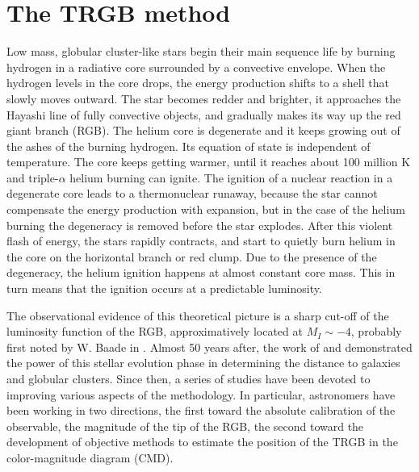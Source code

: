 \documentclass[11pt,preprint2]{aastex}
\begin{document}
\section{The TRGB method}
Low mass, globular cluster-like stars begin their main sequence life by burning hydrogen in a radiative core surrounded by a convective envelope. When the hydrogen levels in the core drops, the energy production shifts to a shell that slowly moves outward. The star becomes redder and brighter, it approaches the Hayashi  line of fully convective objects, and gradually makes its way up the red giant branch (RGB). The helium core is degenerate and it keeps growing out of the ashes of the burning hydrogen. Its equation of state is independent of temperature. The core keeps getting warmer, until it reaches about 100 million K and triple-$\alpha$ helium burning can ignite. The ignition of a nuclear reaction in a degenerate core leads to a thermonuclear runaway, because the star cannot compensate the energy production with expansion, but in the case of the helium burning the degeneracy is removed before the star explodes. After this violent flash of energy, the stars rapidly contracts, and start to quietly burn helium in the core on the horizontal branch or red clump. Due to the presence of the degeneracy, the helium ignition happens at almost constant core mass. This in turn means that the ignition occurs at a predictable luminosity.

The observational evidence of this theoretical picture is a sharp cut-off of the luminosity function of the RGB, approximatively located at $M_I \sim -4$, probably first noted by W. Baade in \citeyear{1944ApJ...100..137B}. Almost 50 years after, the work of \cite{1990AJ....100..162D} and \cite{1993ApJ...417..553L} demonstrated the power of this stellar evolution phase in determining the distance to galaxies and globular clusters. Since then, a series of studies have been devoted to improving various aspects of the methodology. In particular, astronomers have been working in two directions, the first toward the absolute calibration of the observable, the magnitude of the tip of the RGB, the second toward the development of objective methods to estimate the position of the TRGB in the color-magnitude diagram (CMD).
\end{document}
